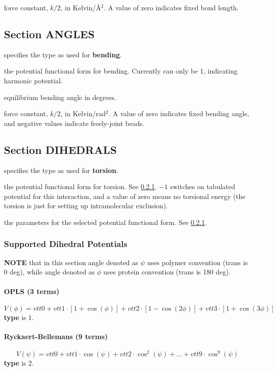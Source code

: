 \documentclass[12pt,letterpaper]{article}
\begin{document}
 force constant, $k/2$, in
Kelvin/\AA$^2$. A value of zero indicates fixed bond length.

\subsection{Section \textbf{ANGLES}}
\label{angles}
 specifies the type as used for {\bf
  bending}.

 the potential functional form for
bending. Currently can only be 1, indicating harmonic
potential.

 equilibrium bending angle in degrees.

 force constant, $k/2$, in
Kelvin/rad$^2$. A value of zero indicates fixed bending
angle, and negative values indicate freely-joint beads.

\subsection{Section \textbf{DIHEDRALS}}
\label{dihedrals}
 specifies the type as used for {\bf
  torsion}.

 the potential functional form for
torsion. See \ref{torsion}. $-1$ switches on tabulated
potential for this interaction, and a value of zero means no
torsional energy (the torsion is just for setting up
intramolecular exclusion).

 the parameters for the selected
potential functional form. See \ref{torsion}.

\subsubsection{Supported Dihedral Potentials}
\label{torsion}
{\bf NOTE} that in this section angle denoted as $\psi$ uses
polymer convention (trans is 0 deg), while angle denoted as
$\phi$ uses protein convention (trans is 180 deg).

\paragraph{OPLS (3 terms)}
\begin{equation}
V(\phi) = vtt0 + vtt1\cdot[1+\cos(\phi)] + vtt2\cdot[1-\cos(2\phi)]
+ vtt3\cdot[1+\cos(3\phi)]
\end{equation}
{\bf type} is 1.

\paragraph{Ryckaert-Bellemans (9 terms)}
\begin{equation}
V(\psi) = vtt0 + vtt1\cdot\cos(\psi) + vtt2\cdot\cos^2(\psi) + \dots + vtt9\cdot\cos^9(\psi)
\end{equation}
{\bf type} is 2.
\end{document}
